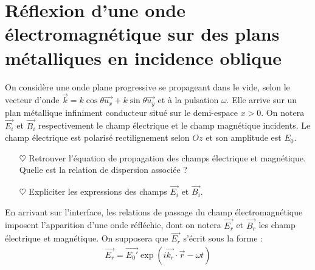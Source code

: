 \documentclass{report}
\begin{document}
\section*{Réflexion d'une onde électromagnétique sur des plans métalliques en incidence oblique}

On considère une onde plane progressive se propageant dans le vide, selon le vecteur d'onde $\vec{k}=k\cos\theta\vec{u_x}+k\sin\theta\vec{u_y}$ et à la pulsation $\omega$. Elle arrive sur un plan métallique infiniment conducteur situé sur le demi-espace $x>0$. On notera $\vec{E_i}$ et $\vec{B_i}$ respectivement le champ électrique et le champ magnétique incidents. Le champ électrique est polarisé rectilignement selon $Oz$ et son amplitude est $E_0$.

\begin{itemize}
		
	\item[$\heartsuit$]	Retrouver l'équation de propagation des champs électrique et magnétique. Quelle est la relation de dispersion associée ? 
	
	\item[$\heartsuit$] Expliciter les expressions des champs $\vec{E_i}$ et $\vec{B_i}$.
	
\end{itemize}

En arrivant sur l'interface, les relations de passage du champ électromagnétique imposent l'apparition d'une onde réfléchie, dont on notera $\vec{E_r}$ et $\vec{B_r}$ les champ électrique et magnétique. On supposera que $\vec{E_r}$ s'écrit sous la forme : 
\begin{align*}
	\vec{E_r}=\vec{E_0'}\exp(i\vec{k_r}\cdot\vec{r}-\omega t)
\end{align*}
\end{document}
